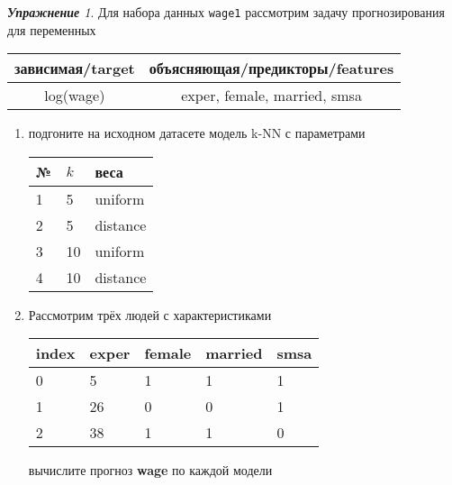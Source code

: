 \documentclass[a4,12pt]{article}
\theoremstyle{remark}
\newtheorem{exercise}{\textbf{Упражнение}}[section]
\begin{document}
\begin{exercise}
Для набора данных \texttt{wage1} рассмотрим задачу прогнозирования
для переменных
\begin{center}
	\begin{tabular}{|c|c|}\hline
		зависимая/target & объясняющая/предикторы/features \\ \hline
		log(wage) & exper, female, married, smsa \\ \hline
	\end{tabular}
\end{center}
\begin{enumerate}
	\item подгоните на исходном датасете модель k-NN с параметрами
	\begin{center}
		\begin{tabular}{|l|l|l|}\hline
		№ & \(k\) & веса \\ \hline
		1 & 5 & uniform \\
		2 & 5 & distance \\
		3 & 10 & uniform \\
		4 & 10 & distance \\ \hline
		\end{tabular}
	\end{center}
	\item Рассмотрим трёх людей с характеристиками
	\begin{center}
		\begin{tabular}{|l||l|l|l|l|}\hline
			index & exper & female & married & smsa \\ \hline\hline
			0 & 5 & 1 & 1 & 1  \\
			1 & 26 & 0 & 0 & 1 \\
			2 & 38 & 1 & 1 & 0 \\ \hline
		\end{tabular}
	\end{center}
	вычислите прогноз \textbf{wage} по каждой модели
\end{enumerate}
\end{exercise}
\end{document}
